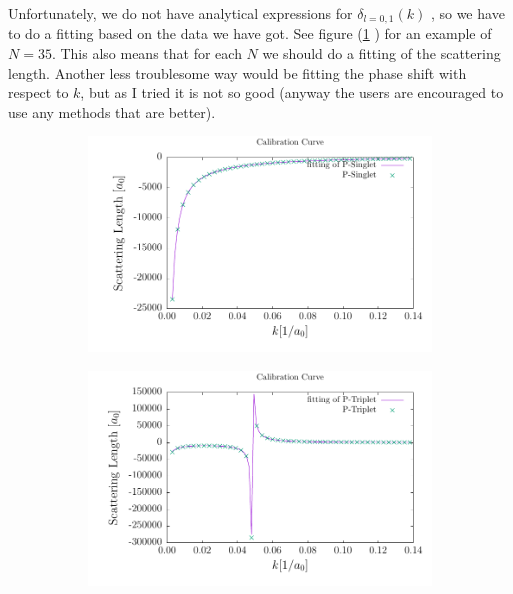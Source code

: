 \documentclass[british,english]{article}
\numberwithin{equation}{section}
\numberwithin{figure}{section}
\begin{document}
 Unfortunately, we do not have analytical expressions for $\delta_{l=0,1}(k)$ , so
we have to do a fitting based on the data we have got. See figure
(\ref{fig:fitting} ) for an example of $N=35$. This also means that for each $N$ we should do a fitting of the scattering length. Another less troublesome way would be fitting the phase shift with respect to $k$, but as I tried it is not so good (anyway the users are encouraged to use any methods that are better).
\begin{figure}
\centering
\begin{subfigure}[h]{0.45\linewidth}
\includegraphics[width=\textwidth]{../Figs/PSinglet}
\end{subfigure}
\begin{subfigure}[h]{0.45\linewidth}
\includegraphics[width=\textwidth]{../Figs/PTriplet}
\end{subfigure}
\caption{
\label{fig:fitting}
~
}
\end{figure}
\end{document}
